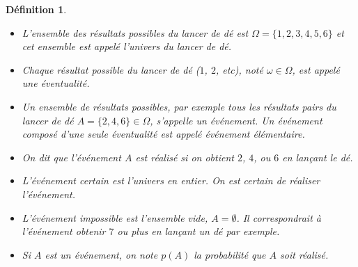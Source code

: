 \documentclass[a4paper,12pt]{book}
\newtheorem{definition}{Définition}
\begin{document}
\begin{definition}\hfill\break
 

\begin{itemize}
\item[$\bullet$] L'ensemble des résultats possibles du lancer de dé est $\Omega=\{1,2,3,4,5,6\}$ et cet ensemble est appelé l'\textit{univers} du lancer de dé.

\item[$\bullet$] Chaque résultat possible du lancer de dé ($1$, $2$, etc), noté $\omega\in\Omega$, est appelé une \textit{éventualité}.

\item[$\bullet$] Un ensemble de résultats possibles, par exemple tous les résultats pairs du lancer de dé $A=\{2, 4, 6\}\in\Omega$, s'appelle un \textit{événement}.
Un événement composé d'une seule éventualité est appelé \textit{événement élémentaire}.

\item[$\bullet$] On dit que l'événement $A$ est \textit{réalisé} si on obtient $2$, $4$, ou $6$ en lançant le dé.

\item[$\bullet$] \textit{L'événement certain} est l'univers en entier. On est certain de réaliser l'événement. 

\item[$\bullet$] \textit{L'événement impossible} est l'ensemble vide, $A=\emptyset$. Il correspondrait à l'événement obtenir $7$ ou plus en lançant un dé par exemple. 

\item[$\bullet$] Si $A$ est un événement, on note $p(A)$ la \textit{probabilité} que $A$ soit réalisé.

\end{itemize}
\end{definition}
\end{document}
